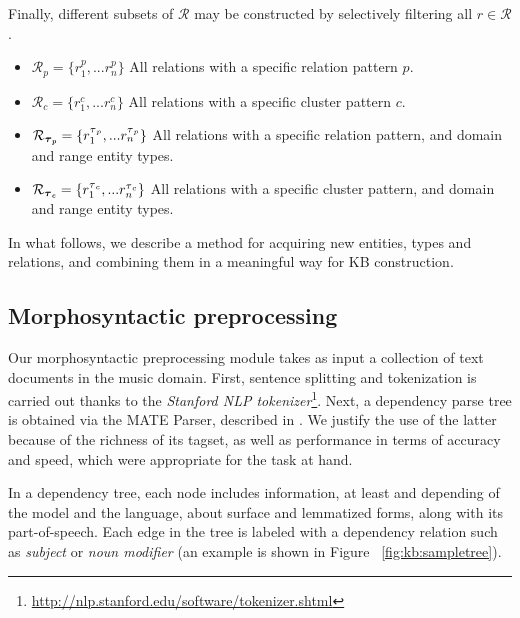 Finally, different subsets of $\mathcal{R}$ may be constructed by selectively filtering all $r \in \mathcal{R}$.  

\begin{itemize}
    \item $\mathcal{R}_{p} = \{r_1^p, ... r_n^p\}$ All relations with a specific relation pattern $p$.
    \item $\mathcal{R}_{c} = \{r_1^c, ... r_n^c\}$ All relations with a specific cluster pattern $c$.
    \item $\mathcal{R}_{\boldsymbol\tau{_\textbf{\textit{p}}}} = \{r_1^{\tau{_p}}, ... r_n^{\tau{_p}}\}$ All relations with a specific relation pattern, and domain and range entity types.
    \item $\mathcal{R}_{\boldsymbol\tau{_\textbf{\textit{c}}}} = \{r_1^{\tau{_c}}, ... r_n^{\tau{_c}}\}$ All relations with a specific cluster pattern, and domain and range entity types.
\end{itemize}

In what follows, we describe a method for acquiring new entities, types and relations, and combining them in a meaningful way for KB construction.


\subsection{Morphosyntactic preprocessing}\label{sec:kb:method:preprocessing}

Our morphosyntactic preprocessing module takes as input a collection of text documents in the music domain. First, sentence splitting and tokenization is carried out thanks to the \textit{Stanford NLP tokenizer}\footnote{\url{http://nlp.stanford.edu/software/tokenizer.shtml}}. 
Next, a dependency parse tree is obtained via the MATE Parser, described in \cite{Bohnet2010}. We justify the use of the latter because of the richness of its tagset, as well as performance in terms of accuracy and speed, which were appropriate for the task at hand.

In a dependency tree, each node includes information, at least and depending of the model and the language, about surface and lemmatized forms, along with its part-of-speech. Each edge in the tree is labeled with a dependency relation such as \textit{subject} or \textit{noun modifier} (an example is shown in Figure ~\ref{fig:kb:sampletree}).


